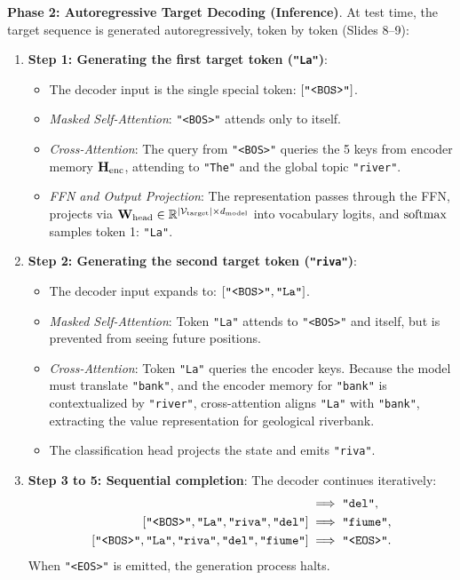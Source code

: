 \documentclass[../../../main.tex]{subfiles}
\begin{document}
\noindent\textbf{Phase 2: Autoregressive Target Decoding (Inference)}.\newline
At test time, the target sequence is generated autoregressively, token by token (Slides 8--9):
\begin{enumerate}
    \item \textbf{Step 1: Generating the first target token (\texttt{"La"})}:
    \begin{itemize}
        \item The decoder input is the single special token: $[\text{\texttt{"<BOS>"}}]$.
        \item \emph{Masked Self-Attention}: \texttt{"<BOS>"} attends only to itself.
        \item \emph{Cross-Attention}: The query from \texttt{"<BOS>"} queries the 5 keys from encoder memory $\mathbf{H}_{\text{enc}}$, attending to \texttt{"The"} and the global topic \texttt{"river"}.
        \item \emph{FFN and Output Projection}: The representation passes through the FFN, projects via $\mathbf{W}_{\text{head}} \in \mathbb{R}^{|\mathcal{V}_{\text{target}}| \times d_{\text{model}}}$ into vocabulary logits, and $\operatorname{\mathrm{softmax}}$ samples token 1: \texttt{"La"}.
    \end{itemize}
    \item \textbf{Step 2: Generating the second target token (\texttt{"riva"})}:
    \begin{itemize}
        \item The decoder input expands to: $[\text{\texttt{"<BOS>"}}, \text{\texttt{"La"}}]$.
        \item \emph{Masked Self-Attention}: Token \texttt{"La"} attends to \texttt{"<BOS>"} and itself, but is prevented from seeing future positions.
        \item \emph{Cross-Attention}: Token \texttt{"La"} queries the encoder keys. Because the model must translate \texttt{"bank"}, and the encoder memory for \texttt{"bank"} is contextualized by \texttt{"river"}, cross-attention aligns \texttt{"La"} with \texttt{"bank"}, extracting the value representation for geological riverbank.
        \item The classification head projects the state and emits \texttt{"riva"}.
    \end{itemize}
    \item \textbf{Step 3 to 5: Sequential completion}: The decoder continues iteratively:
    \begin{align}
    [\text{\texttt{"<BOS>"}}, \text{\texttt{"La"}}, \text{\texttt{"riva"}}] &\implies \text{\texttt{"del"}}, \\
    [\text{\texttt{"<BOS>"}}, \text{\texttt{"La"}}, \text{\texttt{"riva"}}, \text{\texttt{"del"}}] &\implies \text{\texttt{"fiume"}}, \\
    [\text{\texttt{"<BOS>"}}, \text{\texttt{"La"}}, \text{\texttt{"riva"}}, \text{\texttt{"del"}}, \text{\texttt{"fiume"}}] &\implies \text{\texttt{"<EOS>"}}.
    \end{align}
    When \texttt{"<EOS>"} is emitted, the generation process halts.
\end{enumerate}
\end{document}
